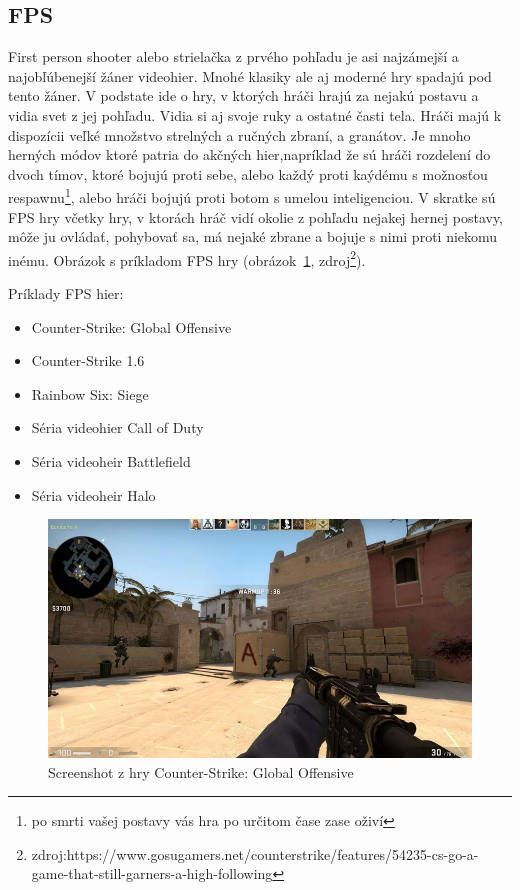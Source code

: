 \documentclass[10pt,oneside,slovak,a4paper]{article}
\begin{document}
\subsection{FPS} \label{zanre:fps}

First person shooter alebo strielačka z prvého pohľadu je asi najzámejší a najobľúbenejší žáner videohier. Mnohé klasiky ale aj moderné hry spadajú pod tento žáner. V podstate ide o hry, v ktorých hráči hrajú za nejakú postavu a vidia svet z jej pohľadu. Vidia si aj svoje ruky a ostatné časti tela. Hráči majú k dispozícii veľké množstvo strelných a ručných zbraní, a granátov. Je mnoho herných módov ktoré patria do akčných hier,napríklad že sú hráči rozdelení do dvoch tímov, ktoré bojujú proti sebe, alebo každý proti kaýdému s možnosťou respawnu\footnote{po smrti vašej postavy vás hra po určitom čase zase oživí}, alebo hráči bojujú proti botom s umelou inteligenciou. V skratke sú FPS hry včetky hry, v ktorách hráč vidí okolie z pohľadu nejakej hernej postavy, môže ju ovládať, pohybovať sa, má nejaké zbrane a bojuje s nimi proti niekomu inému. Obrázok s príkladom FPS hry (obrázok~\ref{f:csgo}, zdroj\footnote{zdroj:https://www.gosugamers.net/counterstrike/features/54235-cs-go-a-game-that-still-garners-a-high-following}). 

Príklady FPS hier:
\begin{itemize}
\item Counter-Strike: Global Offensive
\item Counter-Strike 1.6
\item Rainbow Six: Siege
\item Séria videohier Call of Duty
\item Séria videoheir Battlefield
\item Séria videoheir Halo
\end{itemize}

\begin{figure}[tbh]
\centering
\includegraphics[scale=0.2]{csgo.jpg}
\caption{Screenshot z hry Counter-Strike: Global Offensive}
\label{f:csgo}
\end{figure}
\end{document}
